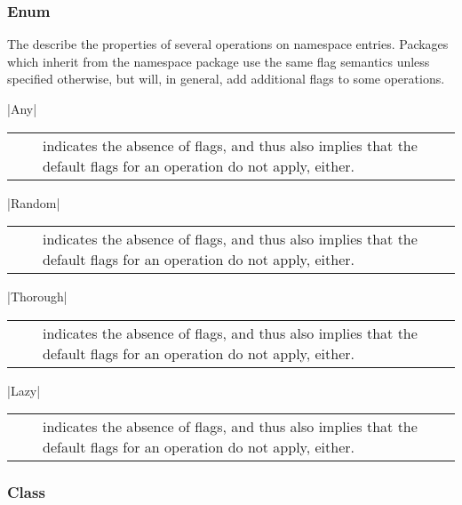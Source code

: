  
  \subsubsection*{Enum }
 
  The  describe the properties of several
  operations on namespace entries.  Packages which inherit from
  the namespace package use the same flag semantics unless
  specified otherwise, but will, in general, add additional flags
  to some operations.
  
    |Any|\\[0.3mm]
    \begin{tabular}{cp{110mm}}
      ~~ & indicates the absence of flags, and thus also
           implies that the default flags for an operation do 
           not apply, either.
    \end{tabular}
 
    |Random|\\[0.3mm]
    \begin{tabular}{cp{110mm}}
      ~~ & indicates the absence of flags, and thus also
           implies that the default flags for an operation do 
           not apply, either.
    \end{tabular}
 
    |Thorough|\\[0.3mm]
    \begin{tabular}{cp{110mm}}
      ~~ & indicates the absence of flags, and thus also
           implies that the default flags for an operation do 
           not apply, either.
    \end{tabular}
 
    |Lazy|\\[0.3mm]
    \begin{tabular}{cp{110mm}}
      ~~ & indicates the absence of flags, and thus also
           implies that the default flags for an operation do 
           not apply, either.
    \end{tabular}
 
 
 \subsubsection*{Class }
 
